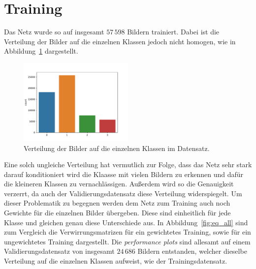 \section{Training}
%
Das Netz wurde so auf insgesamt $57\,598$ Bildern trainiert. Dabei ist die
Verteilung der Bilder auf die einzelnen Klassen jedoch nicht homogen, wie in
Abbildung~\ref{fig:count} dargestellt.
%
\begin{figure}
  \centering
  \includegraphics[width=0.5\textwidth]{Plots/countplot_smaller.pdf}
  \caption{Verteilung der Bilder auf die einzelnen Klassen im Datensatz.}
  \label{fig:count}
\end{figure}
%
Eine solch ungleiche Verteilung hat vermutlich zur Folge, dass das Netz sehr
stark darauf konditioniert wird die Klaasse mit vielen Bildern zu erkennen und
dafür die kleineren Klassen zu vernachlässigen. Außerdem wird so die
Genauigkeit verzerrt, da auch der Validierungsdatensatz diese Verteilung
widerspiegelt. Um dieser Problematik zu begegnen werden dem Netz zum Training
auch noch Gewichte für die einzelnen Bilder übergeben. Diese sind einheitlich
für jede Klasse und gleichen genau diese Unterschiede aus.
In Abbildung~\ref{fig:eq_all} sind zum Vergleich die Verwirrungsmatrizen
für ein gewichtetes Training, sowie für ein ungewichtetes Training dargestellt.
Die \textit{performance plots} sind allesamt auf einem Validierungsdatensatz
von insgesamt $24\,686$ Bildern entstanden, welcher dieselbe Verteilung auf
die einzelnen Klassen aufweist, wie der Trainingsdatensatz.
%
